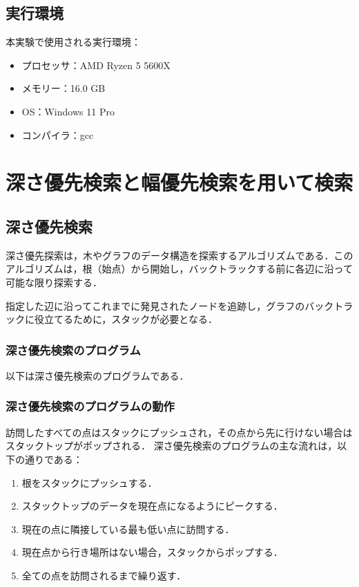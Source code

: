 \documentclass[a4j, titlepage]{jarticle}
\begin{document}
    
    \subsection{実行環境}
    本実験で使用される実行環境：
    \begin{screen}
        \begin{itemize}
            \item プロセッサ：AMD Ryzen 5 5600X
            \item メモリー：16.0 GB
            \item OS：Windows 11 Pro
            \item コンパイラ：gcc
        \end{itemize}    
    \end{screen}

\section{深さ優先検索と幅優先検索を用いて検索}
    \subsection{深さ優先検索}
    深さ優先探索は，木やグラフのデータ構造を探索するアルゴリズムである．このアルゴリズムは，根（始点）から開始し，バックトラックする前に各辺に沿って可能な限り探索する．

    指定した辺に沿ってこれまでに発見されたノードを追跡し，グラフのバックトラックに役立てるために，スタックが必要となる．

        \subsubsection{深さ優先検索のプログラム}
        以下は深さ優先検索のプログラムである．
         
        
        \subsubsection{深さ優先検索のプログラムの動作}
        訪問したすべての点はスタックにプッシュされ，その点から先に行けない場合はスタックトップがポップされる．
        深さ優先検索のプログラムの主な流れは，以下の通りである：
        \begin{screen}
            \begin{enumerate}
                \item 根をスタックにプッシュする．
                \item スタックトップのデータを現在点になるようにピークする．
                \item 現在の点に隣接している最も低い点に訪問する．
                \item 現在点から行き場所はない場合，スタックからポップする．
                \item 全ての点を訪問されるまで繰り返す．
            \end{enumerate}
        \end{screen}
        
\end{document}
